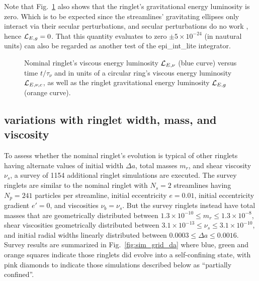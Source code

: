 \documentclass[preprint]{aastex62}
\begin{document}
Note that Fig.\ \ref{fig:nominal_energy_luminosity} also shows that 
the ringlet's gravitational energy luminosity is zero. Which is to be expected since 
the streamlines' gravitating ellipses only interact via their secular
perturbations, and secular perturbations do no work \citep{BC61}, hence ${\cal L}_{E,g}=0$.
That this quantity evaluates to zero $\pm5\times10^{-24}$ (in nautural units) can also be regarded
as another test of the  epi\_int\_lite integrator.

\begin{figure}
    \caption{
        \label{fig:nominal_energy_luminosity}
        Nominal ringlet's viscous energy luminosity ${\cal L}_{E,\nu}$ (blue curve) versus time $t/\tau_\nu$
        and in units of a circular ring's viscous energy luminosity ${\cal L}_{E,\nu,c}$, 
        as well as the ringlet gravitational energy luminosity ${\cal L}_{E,g}$ (orange curve).
    }
\end{figure}


\subsection{variations with ringlet width, mass, and viscosity}
\label{subsec:variations}

To assess whether the nominal ringlet's evolution is typical of other ringlets
having alternate values of initial width $\Delta a$, total masses $m_r$, and shear viscosity $\nu_s$,
a survey of 1154 additional ringlet simulations are executed. 
The survey ringlets are similar to the nominal ringlet 
with $N_s=2$ streamlines having $N_p=241$ particles per streamline, initial 
eccentricity $e=0.01$, initial eccentricity gradient $e'=0$, and viscosities $\nu_b=\nu_s$. 
But the survey ringlets instead have
total masses that are geometrically distributed between $1.3\times10^{-10}\le m_r\le1.3\times10^{-8}$,
shear viscosities geometrically distributed 
between $3.1\times10^{-13}\le \nu_s\le3.1\times10^{-10}$,
and initial radial widths linearly distributed between  
$0.0003\le \Delta a\le0.0016$. Survey results are summarized in Fig.\ \ref{fig:sim_grid_da}
where blue, green and orange squares indicate those ringlets did evolve into a self-confining state,
with pink diamonds to indicate those simulations described below as ``partially confined''.
\end{document}
